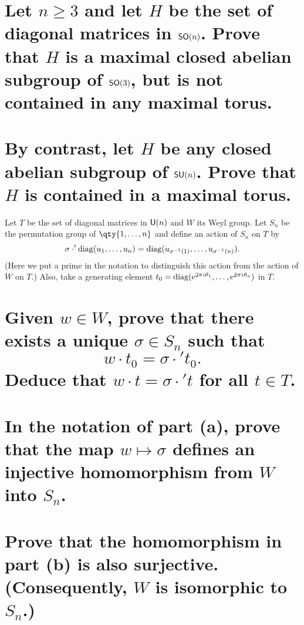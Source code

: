 \documentclass[
	pages,
	boxes,
	color=WildStrawberry
]{homework}
\begin{document}
\begin{problem}
\begin{parts}
	\part{Let $n \geq 3$ and let $H$ be the set of diagonal matrices in $\mathsf{SO}(n)$. Prove that $H$ is a maximal closed abelian subgroup of $\mathsf{SO}(3)$, but is not contained in any maximal torus.}\label{part:5a}
	\part{By contrast, let $H$ be any closed abelian subgroup of $\mathsf{SU}(n)$. Prove that $H$ is contained in a maximal torus.}\label{part:5b}
\end{parts}
\end{problem}

\begin{problem}
Let $T$ be the set of diagonal matrices in $\mathsf{U}(n)$ and $W$ its Weyl group. Let $S_n$ be the permutation group of $\qty{1, \ldots, n}$ and define an action of $S_n$ on $T$ by
\[
	\sigma \cdot' \operatorname{diag}(u_1, \ldots, u_n) = \operatorname{diag}(u_{\sigma^{-1}(1)}, \ldots, u_{\sigma^{-1}(n)}).
\]
(Here we put a prime in the notation to distinguish this action from the action of $W$ on $T$.) Also, take a generating element $t_0 = \operatorname{diag}(\mathrm{e}^{2\pi\mkern1mu\mathrm{i}\mkern1mu \theta_1}, \ldots, \mathrm{e}^{2\pi\mkern1mu\mathrm{i}\mkern1mu \theta_n})$ in $T$.
\begin{parts}
	\part{Given $w \in W$, prove that there exists a unique $\sigma \in S_n$ such that
		\[
			w \cdot t_0 = \sigma \cdot' t_0.
		\]
		Deduce that $w \cdot t = \sigma \cdot' t$ for all $t \in T$.}\label{part:6a}
	\part{In the notation of part (a), prove that the map $w \mapsto \sigma$ defines an injective homomorphism from $W$ into $S_n$.}\label{part:6b}
	\part{Prove that the homomorphism in part (b) is also surjective. (Consequently, $W$ is isomorphic to $S_n$.)}\label{part:6c}
\end{parts}

\end{problem}
\end{document}
